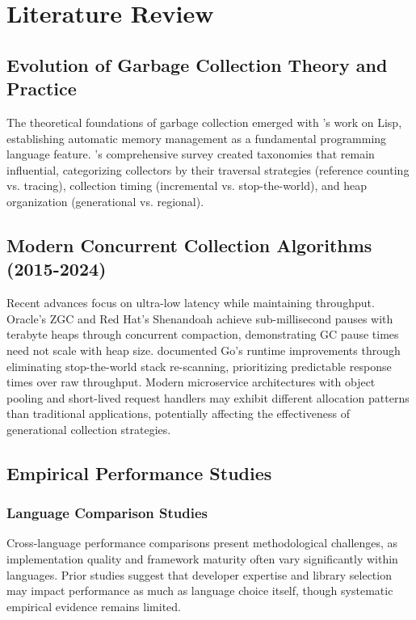 \documentclass{article}
\begin{document}
\section{Literature Review}

\subsection{Evolution of Garbage Collection Theory and Practice}

The theoretical foundations of garbage collection emerged with \citet{mccarthy1960lisp}'s work on Lisp, establishing automatic memory management as a fundamental programming language feature. \citet{wilson1992garbage}'s comprehensive survey created taxonomies that remain influential, categorizing collectors by their traversal strategies (reference counting vs. tracing), collection timing (incremental vs. stop-the-world), and heap organization (generational vs. regional).

\subsection{Modern Concurrent Collection Algorithms (2015-2024)}

Recent advances focus on ultra-low latency while maintaining throughput. Oracle's ZGC \citep{liden2018zgc} and Red Hat's Shenandoah \citep{flood2016shenandoah} achieve sub-millisecond pauses with terabyte heaps through concurrent compaction, demonstrating GC pause times need not scale with heap size. \citet{clements2016gc} documented Go's runtime improvements through eliminating stop-the-world stack re-scanning, prioritizing predictable response times over raw throughput. Modern microservice architectures with object pooling and short-lived request handlers may exhibit different allocation patterns than traditional applications, potentially affecting the effectiveness of generational collection strategies.

\subsection{Empirical Performance Studies}

\subsubsection{Language Comparison Studies}

Cross-language performance comparisons present methodological challenges, as implementation quality and framework maturity often vary significantly within languages. Prior studies suggest that developer expertise and library selection may impact performance as much as language choice itself, though systematic empirical evidence remains limited.
\end{document}
